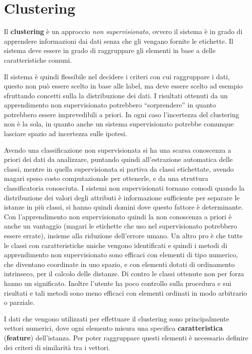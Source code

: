 \chapter{Clustering}
Il \textbf{clustering} è un approccio \textit{non supervisionato}, ovvero il
sistema è in grado di apprendere informazioni dai dati senza che gli vengano
fornite le etichette. Il sistema deve essere in grado di raggruppare gli elementi
in base a delle caratteristiche comuni.

Il sistema è quindi flessibile nel decidere i criteri con cui raggruppare i dati,
questo non può essere scelto in base alle label, ma deve essere scelto ad esempio
sfruttando concetti sulla la distribuzione dei dati. I risultati ottenuti da un
apprendimento non supervisionato potrebbero “sorprendere” in quanto potrebbero essere
imprevedibili a priori. In ogni caso l'incertezza del clustering non è la sola,
in quanto anche un sistema supervisionato potrebbe comunque lasciare spazio ad
incertezza sulle ipotesi.

Avendo una classificazione non supervisionata si ha una scarsa conoscenza a
priori dei dati da analizzare, puntando quindi all'estrazione automatica delle
classi, mentre in quella supervisionata si partiva da classi etichettate, avendo
magari speso costo computazionale per ottenerle, e da una struttura classificatoria
conosciuta. I sistemi non supervisionati tornano comodi quando la distribuzione dei
valori degli attributi è informazione sufficiente per separare le istanze in più
classi, si hanno quindi domini dove questo fattore è determinante. Con
l'apprendimento non supervisionato quindi la non conoscenza a priori è anche un
vantaggio (magari le etichette che uso nel supervisionato potrebbero essere errate),
insieme alla riduzione dell'errore umano. Un altro pro è che tutte le classi con
caratteristiche uniche vengono identificati e quindi i metodi di apprendimento
non supervisionato sono efficaci con elementi di tipo numerico, che diventano
coordinate in uno spazio, e con elementi dotati di ordinamento intrinseco, per
il calcolo delle distanze. Di contro le classi ottenute non per forza hanno un
significato. Inoltre l'utente ha poco controllo sulla procedura e sui risultati e
tali metodi sono meno efficaci con elementi ordinati in modo arbitrario o parziale.

I dati che vengono utilizzati per effettuare il clustering sono principalmente
vettori numerici, dove ogni elemento misura una specifica \textbf{caratteristica}
(\textbf{feature}) dell'istanza. Per poter raggruppare questi elementi è necessario
definire dei criteri di similarità tra i vettori.

